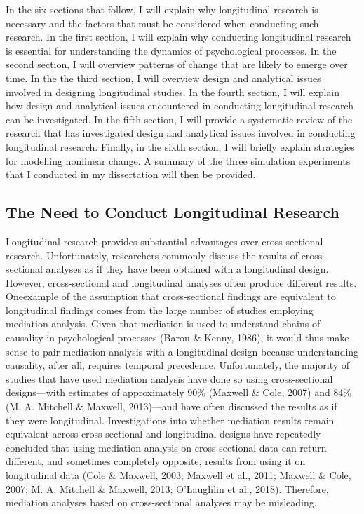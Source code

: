 \documentclass[
  english,
  man,floatsintext]{apa7}
\begin{document}
In the six sections that follow, I will explain why longitudinal research is necessary and the factors that must be considered when conducting such research. In the first section, I will explain why conducting longitudinal research is essential for understanding the dynamics of psychological processes. In the second section, I will overview patterns of change that are likely to emerge over time. In the the third section, I will overview design and analytical issues involved in designing longitudinal studies. In the fourth section, I will explain how design and analytical issues encountered in conducting longitudinal research can be investigated. In the fifth section, I will provide a systematic review of the research that has investigated design and analytical issues involved in conducting longitudinal research. Finally, in the sixth section, I will briefly explain strategies for modelling nonlinear change. A summary of the three simulation experiments that I conducted in my dissertation will then be provided.

\hypertarget{the-need-to-conduct-longitudinal-research}{%
\subsection{The Need to Conduct Longitudinal Research}\label{the-need-to-conduct-longitudinal-research}}

Longitudinal research provides substantial advantages over cross-sectional research. Unfortunately, researchers commonly discuss the results of cross-sectional analyses as if they have been obtained with a longitudinal design. However, cross-sectional and longitudinal analyses often produce different results. Oneexample of the assumption that cross-sectional findings are equivalent to longitudinal findings comes from the large number of studies employing mediation analysis. Given that mediation is used to understand chains of causality in psychological processes (Baron \& Kenny, 1986), it would thus make sense to pair mediation analysis with a longitudinal design because understanding causality, after all, requires temporal precedence. Unfortunately, the majority of studies that have used mediation analysis have done so using cross-sectional designs---with estimates of approximately 90\% (Maxwell \& Cole, 2007) and 84\% (M. A. Mitchell \& Maxwell, 2013)---and have often discussed the results as if they were longitudinal. Investigations into whether mediation results remain equivalent across cross-sectional and longitudinal designs have repeatedly concluded that using mediation analysis on cross-sectional data can return different, and sometimes completely opposite, results from using it on longitudinal data (Cole \& Maxwell, 2003; Maxwell et al., 2011; Maxwell \& Cole, 2007; M. A. Mitchell \& Maxwell, 2013; O'Laughlin et al., 2018). Therefore, mediation analyses based on cross-sectional analyses may be misleading.
\end{document}
